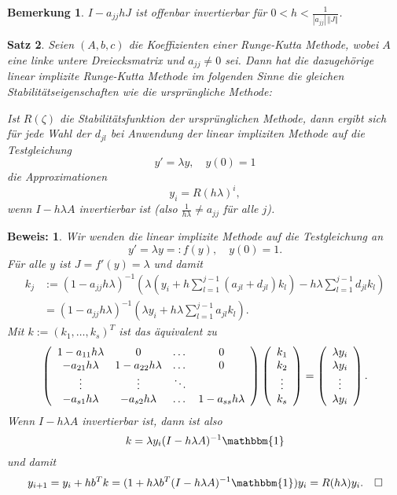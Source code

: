 \documentclass[12pt,a4paper]{book}
\theoremstyle{break}
\newtheorem{theorem}{Satz}[chapter]
\newtheorem{bemerkung}[theorem]{Bemerkung}
\theoremstyle{nonumberplain}
\newtheorem{beweis}{Beweis:}
\newcommand{\norm}[1]{\left\Vert#1\right\Vert}		%
\newcommand{\1}{\mathbbm{1}} 			      	%
\begin{document}
\begin{bemerkung}\label{rem:LinImpl_invertible}
$I-a_{jj} hJ$ ist offenbar invertierbar für $0<h<\frac{1}{|a_{jj}|\, \norm{J}}$.
\end{bemerkung}

\begin{theorem}\label{thm:lin_impl_stab}
Seien $(A,b,c)$ die Koeffizienten einer Runge-Kutta Methode, wobei $A$ eine linke untere Dreiecksmatrix und $a_{jj}\neq 0$ sei. Dann hat die dazugehörige linear implizite Runge-Kutta Methode im folgenden Sinne die gleichen Stabilitätseigenschaften wie die ursprüngliche Methode:

Ist $R(\zeta)$ die Stabilitätsfunktion der ursprünglichen Methode, dann ergibt sich für jede Wahl der $d_{jl}$ bei Anwendung der linear impliziten Methode auf die Testgleichung
\[
y'=\lambda y, \quad y(0)=1
\]
die Approximationen
\[
y_i=R(h\lambda)^i,
\]
wenn $I-h\lambda A$ invertierbar ist (also $\frac{1}{h\lambda}\neq a_{jj}$ für alle $j$).
\end{theorem}
\begin{beweis}
Wir wenden die linear implizite Methode auf die Testgleichung an
\[
y'=\lambda y=:f(y), \quad y(0)=1.
\]
Für alle $y$ ist $J=f'(y)=\lambda$ und damit
\begin{align*}
k_j &:=  (1- a_{jj} h \lambda)^{-1} \left( \lambda(y_i + h \sum_{l=1}^{j-1} (a_{jl}+d_{jl}) k_l ) - h \lambda \sum_{l=1}^{j-1} d_{jl} k_l \right)\\
&= (1- a_{jj} h \lambda)^{-1} \left( \lambda y_i + h \lambda \sum_{l=1}^{j-1} a_{jl} k_l  \right).
\end{align*}
Mit $k:=(k_1,\ldots,k_s)^T$ ist das äquivalent zu
\[
\left( \begin{array}{c c c c}
1-a_{11}h\lambda & 0 & \dots & 0\\
-a_{21} h\lambda & 1-a_{22}h\lambda & \dots & 0\\
\vdots & \vdots & \ddots \\
-a_{s1} h\lambda & -a_{s2} h\lambda &  \dots & 1-a_{ss}h\lambda
\end{array}\right)
\left( \begin{array}{c} k_1\\ k_2\\ \vdots \\ k_s \end{array} \right)
= \left( \begin{array}{c} \lambda y_i\\ \lambda y_i\\ \vdots \\ \lambda y_i \end{array} \right).
\]
Wenn $I-h\lambda A$ invertierbar ist, dann ist also
\[
k=\lambda y_i (I-h\lambda A)^{-1}  \1
\]
und damit
\[
y_{i+1}=y_i+h b^T k=(1+ h \lambda b^T(I-h\lambda A)^{-1} \1)y_i=R(h\lambda)y_i.\quad \Box
\]
\end{beweis}
\end{document}
